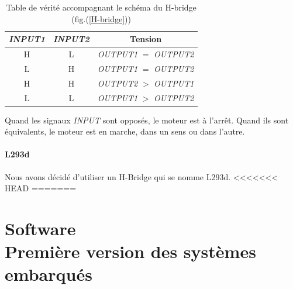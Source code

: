 \documentclass[a4paper,12pt]{report}
\begin{document}
{\begin{table}%
\begin{center}
  \begin{tabular}{c|c||c}  
    \emph{INPUT1} & \emph{INPUT2}
    & Tension\\
    \hline
    H & L & \emph{OUTPUT1} $=$ \emph{OUTPUT2}\\
    L & H & \emph{OUTPUT1} $=$ \emph{OUTPUT2}\\
    H & H & \emph{OUTPUT2} $>$ \emph{OUTPUT1}\\
    L & L & \emph{OUTPUT1} $>$ \emph{OUTPUT2}\\
  \end{tabular}
\end{center}

\caption{\label{tableDeVerite} Table de v\'erit\'e accompagnant le sch\'ema du
H-bridge (fig.(\ref{H-bridge}))}

\small Quand les signaux \emph{INPUT} sont oppos\'es, le moteur est \`a
l'arr\^et. Quand ils sont \'equivalents, le moteur est en marche, dans un sens
ou dans l'autre.\normalsize
\end{table}

\subsubsection{L293d}
Nous avons décidé d'utiliser un H-Bridge qui se nomme L293d.
<<<<<<< HEAD
=======





\chapter{Software \\ \Large Première version des systèmes embarqués}


}
\end{document}
